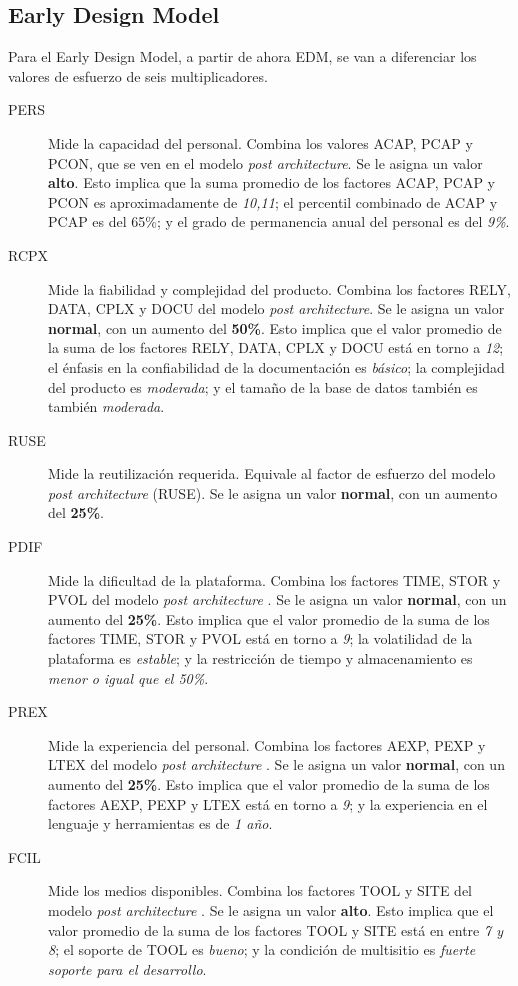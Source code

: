 \documentclass[11pt,a4paper,spanish,twoside]{book}
\begin{document}
\subsection{Early Design Model}
Para el Early Design Model, a partir de ahora EDM, se van a diferenciar los
valores de esfuerzo de seis multiplicadores.

\begin{description}
\item[PERS] Mide la capacidad del personal. Combina los valores ACAP, PCAP y
PCON, que se ven en el modelo \emph{post architecture}. Se le asigna un
valor \textbf{alto}. Esto implica que la suma promedio de los factores
ACAP, PCAP y PCON es aproximadamente de \emph{10,11}; el percentil combinado
de ACAP y PCAP es del 65\%; y el grado de permanencia anual del personal es
del \emph{9\%}.

\item[RCPX] Mide la fiabilidad y complejidad del producto. Combina los
factores RELY, DATA, CPLX y DOCU del modelo \emph{post architecture}. Se le
asigna un valor \textbf{normal}, con un aumento del \textbf{50\%}. Esto
implica que el valor promedio de la suma de los factores RELY, DATA, CPLX y
DOCU está en torno a \emph{12}; el énfasis en la confiabilidad de la
documentación es \emph{básico}; la complejidad del producto es
\emph{moderada}; y el tamaño de la base de datos también es también
\emph{moderada}.

\item[RUSE] Mide la reutilización requerida. Equivale al factor de esfuerzo
del modelo \emph{post architecture} (RUSE). Se le asigna un valor
\textbf{normal}, con un aumento del \textbf{25\%}.

\item[PDIF] Mide la dificultad de la plataforma. Combina los factores TIME, 
STOR y PVOL del modelo \emph{post architecture} . Se le asigna un valor
\textbf{normal}, con un aumento del \textbf{25\%}. Esto implica que el valor 
promedio de la suma de los factores TIME, STOR y PVOL está en torno a \emph{9};
la volatilidad de la plataforma es \emph{estable}; y la restricción de tiempo y
almacenamiento es \emph{menor o igual que el 50\%}.

\item[PREX] Mide la experiencia del personal. Combina los factores AEXP, PEXP y
LTEX del modelo \emph{post architecture} . Se le asigna un valor 
\textbf{normal}, con un aumento del \textbf{25\%}. Esto implica que el valor 
promedio de la suma de los factores AEXP, PEXP y LTEX está en torno a \emph{9};
y la experiencia en el lenguaje y herramientas es de \emph{1 año}.

\item[FCIL] Mide los medios disponibles. Combina los factores TOOL y SITE del 
modelo \emph{post architecture} . Se le asigna un valor \textbf{alto}. Esto 
implica que el valor promedio de la suma de los factores TOOL y SITE está en 
entre \emph{7 y 8}; el soporte de TOOL es \emph{bueno}; y la condición de 
multisitio es \emph{fuerte soporte para el desarrollo}.

\end{description}
\end{document}

